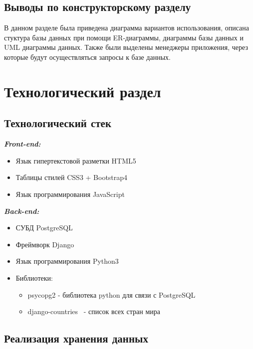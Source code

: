 \documentclass[a4paper,14pt]{extarticle}
\begin{document}
 	\subsection*{Выводы по конструкторскому разделу}
 	
 	В данном разделе была приведена диаграмма вариантов использования, описана стуктура базы данных при помощи ER-диаграммы, диаграммы базы данных и UML диаграммы данных. Также были выделены менеджеры приложения, через которые будут осуществляться запросы к базе данных.
 	
 	\newpage
 	\section{Технологический раздел}
 	
 	\subsection{Технологический стек}
 	
 	\textit{\bf Front-end:}
 	\begin{itemize}
 		\item Язык гипертекстовой разметки HTML5\cite{html}
 		\item Таблицы стилей CSS3\cite{css} + Bootstrap4\cite{bootstrap}
 		\item Язык программирования JavaScript\cite{js}
 	\end{itemize}
 	
 	\textit{\bf Back-end:}
 	\begin{itemize}
 		\item СУБД PostgreSQL\cite{postgresql}
 		\item Фреймворк Django\cite{django}
 		\item Язык программирования Python3\cite{python}
 		\item Библиотеки:
 		\begin{itemize}
 			\item psycopg2\cite{psycopg2} - библиотека python для связи с PostgreSQL
 			\item django-countries~\cite{countries} - список всех стран мира
 		\end{itemize}
 	\end{itemize}
 
 	\newpage
 
 	\subsection{Реализация хранения данных}
 	
\end{document}
